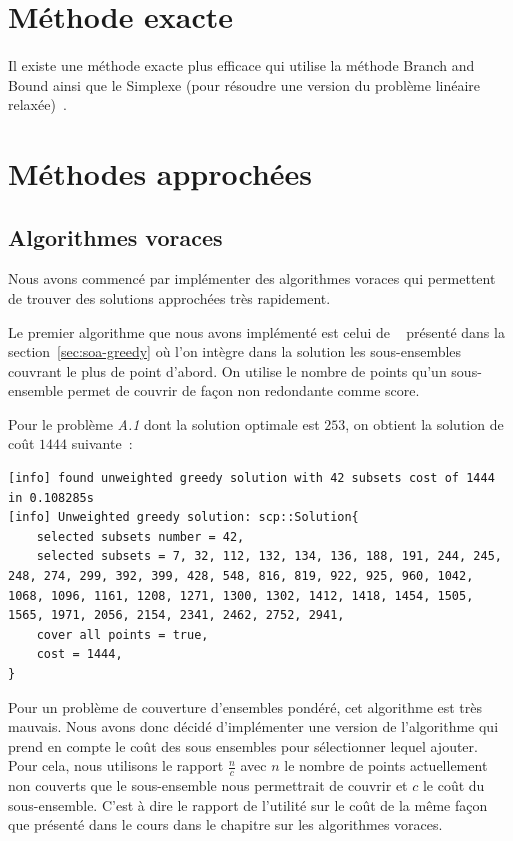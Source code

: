 \documentclass[12pt,letterpaper,twoside]{article}
\begin{document}
	\section{Méthode exacte}
		\paragraph*{}
			Il existe une méthode exacte plus efficace qui utilise la méthode Branch and Bound ainsi que le Simplexe (pour résoudre une version
			du problème linéaire relaxée)~\cite{caprara2000algorithms}.
	\section{Méthodes approchées}
		\subsection{Algorithmes voraces}
			Nous avons commencé par implémenter des algorithmes voraces qui permettent de trouver des solutions approchées très rapidement.

			Le premier algorithme que nous avons implémenté est celui de
			\citeauthor{Johnson:1973:AAC:800125.804034}~\cite{Johnson:1973:AAC:800125.804034} présenté dans la section~\ref{sec:soa-greedy}
			où l'on intègre dans la solution les sous-ensembles couvrant le plus de point d'abord.
			On utilise le nombre de points qu'un sous-ensemble permet de couvrir de façon non redondante comme score.

			Pour le problème \emph{A.1} dont la solution optimale est \(253\), on obtient la solution de coût \(1444\) suivante :

			\begin{lstlisting}[breaklines=true]
[info] found unweighted greedy solution with 42 subsets cost of 1444 in 0.108285s
[info] Unweighted greedy solution: scp::Solution{
	selected subsets number = 42,
	selected subsets = 7, 32, 112, 132, 134, 136, 188, 191, 244, 245, 248, 274, 299, 392, 399, 428, 548, 816, 819, 922, 925, 960, 1042, 1068, 1096, 1161, 1208, 1271, 1300, 1302, 1412, 1418, 1454, 1505, 1565, 1971, 2056, 2154, 2341, 2462, 2752, 2941, 
	cover all points = true,
	cost = 1444,
}
			\end{lstlisting}

			Pour un problème de couverture d'ensembles pondéré, cet algorithme est très mauvais.
			Nous avons donc décidé d'implémenter une version de l'algorithme qui prend en compte le coût des sous ensembles pour
			sélectionner lequel ajouter.
			Pour cela, nous utilisons le rapport \(\frac{n}{c}\) avec \(n\) le nombre de points actuellement non couverts que le
			sous-ensemble nous permettrait de couvrir et \(c\) le coût du sous-ensemble. C'est à dire le rapport de l'utilité sur
			le coût de la même façon que présenté dans le cours dans le chapitre sur les algorithmes voraces.
\end{document}
